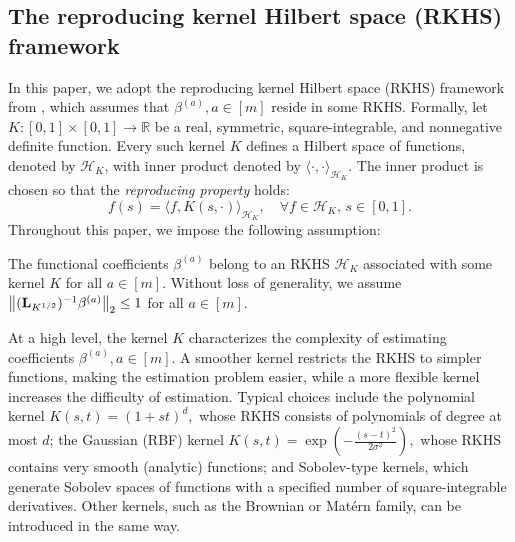 \documentclass[mnsc]{informs3aa} %
\newcommand{\betaa}{\beta^{(a)}}
\newcommand{\norm}[1]{\left\|#1\right\|}
\newcommand{\bL}{\bold L}
\newcommand{\mF}{\mathcal F}
\begin{document}
\subsection{The reproducing kernel Hilbert space (RKHS) framework}
In this paper, we adopt the reproducing kernel Hilbert space (RKHS) framework from \cite{cai2012minimax}, which assumes that $\betaa,a\in[m]$ reside in some RKHS. Formally, let $K:[0,1]\times[0,1]\to\mathbb{R}$ be a real, symmetric, square-integrable, and nonnegative definite function. Every such kernel $K$ defines a Hilbert space of functions, denoted by $\mathcal{H}_K$, with inner product denoted by $\langle \cdot, \cdot \rangle_{\mathcal{H}_K}$. The inner product is chosen so that the \emph{reproducing property} holds:
\[
f(s) = \langle f, K(s,\cdot) \rangle_{\mathcal{H}_K}, 
\quad \forall f \in \mathcal{H}_K, \, s \in [0,1].
\]
Throughout this paper, we impose the following assumption:
\begin{assumption}\label{asmp:RKHS}
	The functional coefficients $\betaa$ belong to an RKHS $\mathcal{H}_K$ associated with some kernel $K$ for all $a\in[m].$ Without loss of generality, we assume $\norm{(\bL_{K^{1/2}})^{-1}\betaa}_2\leq 1$ for all $a\in[m].$
\end{assumption}
At a high level, the kernel $K$ characterizes the complexity of estimating coefficients $\betaa,a\in[m]$. A smoother kernel restricts the RKHS to simpler functions, making the estimation problem easier, while a more flexible kernel increases the difficulty of estimation. Typical choices include the polynomial kernel $K(s,t)=(1+st)^d,$ whose RKHS consists of polynomials of degree at most $d$; the Gaussian (RBF) kernel $K(s,t)=\exp\!\left(-\tfrac{(s-t)^2}{2\sigma^2}\right),$ whose RKHS contains very smooth (analytic) functions; and Sobolev-type kernels, which generate Sobolev spaces of functions with a specified number of square-integrable derivatives. Other kernels, such as the Brownian or Matérn family, can be introduced in the same way. 

\end{document}
